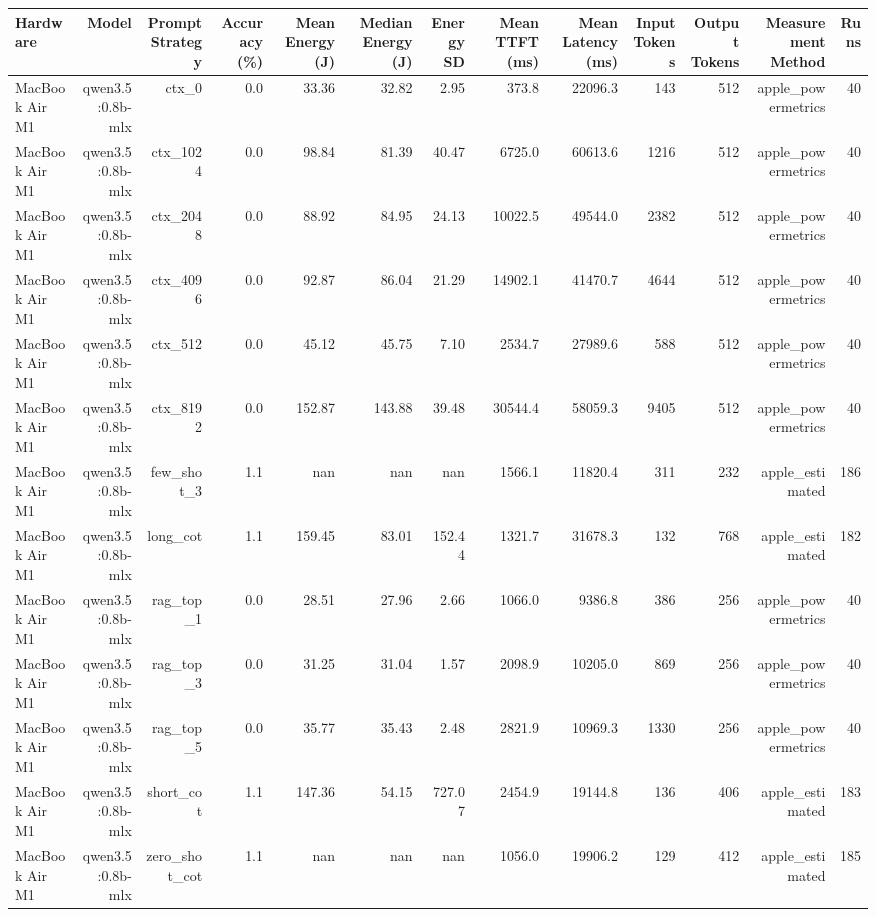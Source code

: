 \begin{tabular}{lrrrrrrrrrrrr}
\hline
Hardware & Model & Prompt Strategy & Accuracy (\%) & Mean Energy (J) & Median Energy (J) & Energy SD & Mean TTFT (ms) & Mean Latency (ms) & Input Tokens & Output Tokens & Measurement Method & Runs \\
\hline
MacBook Air M1 & qwen3.5:0.8b-mlx & ctx\_0 & 0.0 & 33.36 & 32.82 & 2.95 & 373.8 & 22096.3 & 143 & 512 & apple\_powermetrics & 40 \\
MacBook Air M1 & qwen3.5:0.8b-mlx & ctx\_1024 & 0.0 & 98.84 & 81.39 & 40.47 & 6725.0 & 60613.6 & 1216 & 512 & apple\_powermetrics & 40 \\
MacBook Air M1 & qwen3.5:0.8b-mlx & ctx\_2048 & 0.0 & 88.92 & 84.95 & 24.13 & 10022.5 & 49544.0 & 2382 & 512 & apple\_powermetrics & 40 \\
MacBook Air M1 & qwen3.5:0.8b-mlx & ctx\_4096 & 0.0 & 92.87 & 86.04 & 21.29 & 14902.1 & 41470.7 & 4644 & 512 & apple\_powermetrics & 40 \\
MacBook Air M1 & qwen3.5:0.8b-mlx & ctx\_512 & 0.0 & 45.12 & 45.75 & 7.10 & 2534.7 & 27989.6 & 588 & 512 & apple\_powermetrics & 40 \\
MacBook Air M1 & qwen3.5:0.8b-mlx & ctx\_8192 & 0.0 & 152.87 & 143.88 & 39.48 & 30544.4 & 58059.3 & 9405 & 512 & apple\_powermetrics & 40 \\
MacBook Air M1 & qwen3.5:0.8b-mlx & few\_shot\_3 & 1.1 & nan & nan & nan & 1566.1 & 11820.4 & 311 & 232 & apple\_estimated & 186 \\
MacBook Air M1 & qwen3.5:0.8b-mlx & long\_cot & 1.1 & 159.45 & 83.01 & 152.44 & 1321.7 & 31678.3 & 132 & 768 & apple\_estimated & 182 \\
MacBook Air M1 & qwen3.5:0.8b-mlx & rag\_top\_1 & 0.0 & 28.51 & 27.96 & 2.66 & 1066.0 & 9386.8 & 386 & 256 & apple\_powermetrics & 40 \\
MacBook Air M1 & qwen3.5:0.8b-mlx & rag\_top\_3 & 0.0 & 31.25 & 31.04 & 1.57 & 2098.9 & 10205.0 & 869 & 256 & apple\_powermetrics & 40 \\
MacBook Air M1 & qwen3.5:0.8b-mlx & rag\_top\_5 & 0.0 & 35.77 & 35.43 & 2.48 & 2821.9 & 10969.3 & 1330 & 256 & apple\_powermetrics & 40 \\
MacBook Air M1 & qwen3.5:0.8b-mlx & short\_cot & 1.1 & 147.36 & 54.15 & 727.07 & 2454.9 & 19144.8 & 136 & 406 & apple\_estimated & 183 \\
MacBook Air M1 & qwen3.5:0.8b-mlx & zero\_shot\_cot & 1.1 & nan & nan & nan & 1056.0 & 19906.2 & 129 & 412 & apple\_estimated & 185 \\

\end{tabular}
